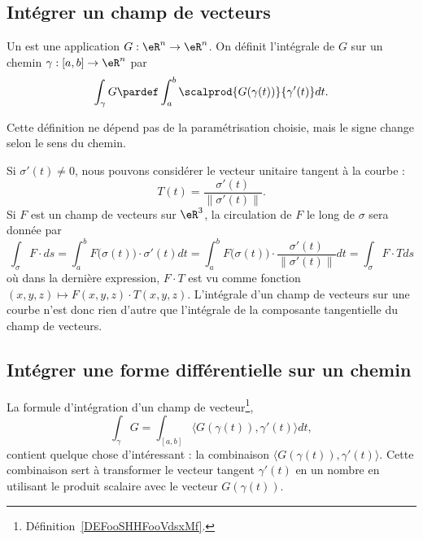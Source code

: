 \subsection{Intégrer un champ de vecteurs}

\begin{definition}      \label{DEFooSHHFooVdsxMf}
    Un  est une application $G : \eR^n \to \eR^n$. On définit l'intégrale de $G$ sur un chemin $\gamma : [a,b] \to \eR^n$ par
    \begin{equation*}
      \int_\gamma G \pardef \int_a^b \scalprod {G(\gamma(t))}{\gamma^\prime(t)} d t.
    \end{equation*}
\end{definition}

\begin{remark}
  Cette définition ne dépend pas de la paramétrisation choisie, mais le signe change selon le sens du chemin.
\end{remark}



    Si $\sigma'(t)\neq 0$, nous pouvons considérer le vecteur unitaire tangent à la courbe :
    \begin{equation}
        T(t)=\frac{ \sigma'(t) }{ \| \sigma'(t) \| }.
    \end{equation}
    Si $F$ est un champ de vecteurs sur $\eR^3$, la circulation de $F$ le long de $\sigma$ sera donnée par
    \begin{equation}
        \int_{\sigma}F\cdot ds=\int_a^b F\big( \sigma(t) \big)\cdot \sigma'(t)dt=\int_{a}^bF\big( \sigma(t) \big)\cdot\frac{ \sigma'(t) }{ \| \sigma'(t) \| }dt=\int_{\sigma} F\cdot T ds
    \end{equation}
    où dans la dernière expression, $F\cdot T$ est vu comme fonction $(x,y,z)\mapsto F(x,y,z)\cdot T(x,y,z)$. L'intégrale d'un champ de vecteurs sur une courbe n'est donc rien d'autre que l'intégrale de la composante tangentielle du champ de vecteurs.

\subsection{Intégrer une forme différentielle sur un chemin}

La formule d'intégration d'un champ de vecteur\footnote{Définition~\ref{DEFooSHHFooVdsxMf}.},
\begin{equation}
	\int_{\gamma}G=\int_{[a,b]}\langle G (\gamma(t)), \gamma'(t)\rangle dt,
\end{equation}
contient quelque chose d'intéressant : la combinaison $\langle G( \gamma(t) ), \gamma'(t)\rangle$. Cette combinaison sert à transformer le vecteur tangent $\gamma'(t)$ en un nombre en utilisant le produit scalaire avec le vecteur $G( \gamma(t) )$.


